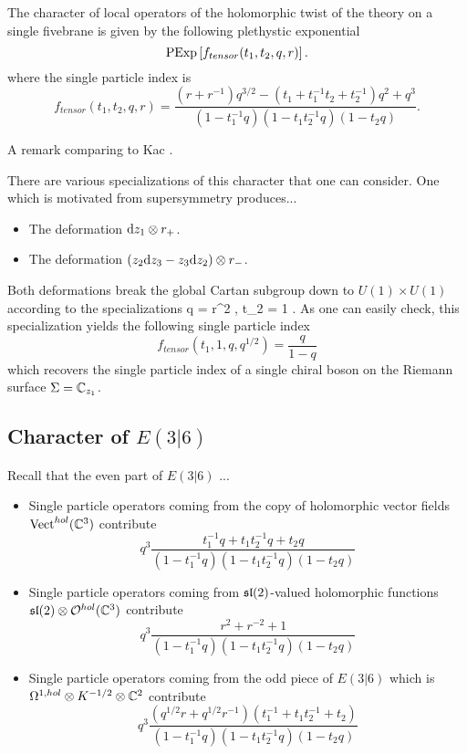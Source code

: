 \documentclass[11pt]{amsart}
\begin{document}
\begin{prop}
The character of local operators of the holomorphic twist of the theory on a single fivebrane is given by the following plethystic exponential
\[
{\rm PExp} \left[f_{tensor} (t_1,t_2,q,r) \right] .
\]
where the single particle index is
\[
f_{tensor} (t_1,t_2,q,r) = \frac{(r + r^{-1})q^{3/2} - (t_1 + t_1^{-1} t_2 + t_2^{-1} )q^2 + q^3}{(1-t_1^{-1}q) (1-t_1 t_2^{-1} q) (1-t_2 q)} .
\]
\end{prop}

\parsec

A remark comparing to Kac \cite{KR1}. 

\parsec

There are various specializations of this character that one can consider. 
One which is motivated from supersymmetry produces...

\begin{itemize}
\item The deformation ${\rm d} z_1 \otimes r_+$.
\item The deformation $(z_2 {\rm d} z_3 - z_3 {\rm d} z_2) \otimes r_-$. 
\end{itemize}

Both deformations break the global Cartan subgroup down to $U(1) \times U(1)$ according to the specializations
\beqn\label{eqn:special1}
q = r^2 , \quad t_2 = 1 .
\eeqn
As one can easily check, this specialization yields the following single particle index
\[
f_{tensor}(t_1, 1, q, q^{1/2}) = \frac{q}{1-q} 
\]
which recovers the single particle index of a single chiral boson on the Riemann surface $\Sigma = \mathbb{C}_{z_1}$. 

\subsection{Character of $E(3|6)$}

\parsec[]

Recall that the even part of $E(3|6)$ ... 

\begin{itemize}
\item Single particle operators coming from the copy of holomorphic vector fields ${\rm Vect}^{hol}(\mathbb{C}^3)$ contribute
\[
q^3 \frac{t_1^{-1} q + t_1 t_2^{-1} q + t_2 q }{(1-t_1^{-1}q) (1-t_1 t_2^{-1} q) (1-t_2 q)} 
\]
\item Single particle operators coming from $\mathfrak{sl}(2)$-valued holomorphic functions $\mathfrak{sl}(2) \otimes \mathcal O^{hol}(\mathbb{C}^3)$ contribute
\[
q^3\frac{r^2 + r^{-2} + 1}{(1-t_1^{-1}q) (1-t_1 t_2^{-1} q) (1-t_2 q)} 
\]
\item Single particle operators coming from the odd piece of $E(3|6)$ which is $\Omega^{1,hol} \otimes K^{-1/2} \otimes \mathbb{C}^2$ contribute
\[
q^{3}\frac{(q^{1/2} r + q^{1/2} r^{-1})(t_1^{-1} + t_1t_2^{-1} + t_2)}{(1-t_1^{-1}q) (1-t_1 t_2^{-1} q) (1-t_2 q)}
\]
\end{itemize}
\end{document}
